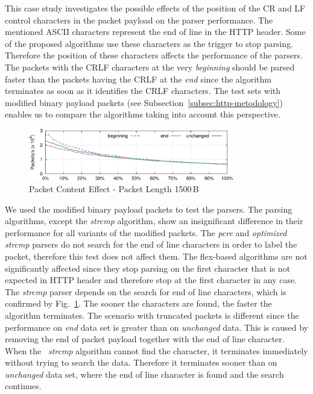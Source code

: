 This case study investigates the possible effects of the position of the CR and LF control characters in the packet payload on the parser performance. The mentioned ASCII characters represent the end of line in the HTTP header. Some of the proposed algorithms use these characters as the trigger to stop parsing. Therefore the position of these characters affects the performance of the parsers. The packets with the CRLF characters at the very \emph{beginning} should be parsed faster than the packets having the CRLF at the \emph{end} since the algorithm terminates as soon as it identifies the CRLF characters. The test sets with modified binary payload packets (see Subsection~\ref{subsec:http-metodology}) enables us to compare the algorithms taking into account this perspective.

\begin{figure}[t]
    \centering
    \includegraphics[width=0.8\textwidth]{figures/paper-http/1500_noflex}
    \caption{Packet Content Effect - Packet Length 1500\,B}
    \label{fig:http-packet_structure}
\end{figure}

We used the modified binary payload packets to test the parsers. The parsing algorithms, except the \emph{strcmp} algorithm, show an insignificant difference in their performance for all variants of the modified packets. The \emph{pcre} and \emph{optimized strcmp} parsers do not search for the end of line characters in order to label the packet, therefore this test does not affect them. The flex-based algorithms are not significantly affected since they stop parsing on the first character that is not expected in HTTP header and therefore stop at the first character in any case. The \emph{strcmp} parser depends on the search for end of line characters, which is confirmed by Fig.~\ref{fig:http-packet_structure}. The sooner the characters are found, the faster the algorithm terminates. The scenario with truncated packets is different since the performance on \emph{end} data set is greater than on \emph{unchanged} data. This is caused by removing the end of packet payload together with the end of line character. When the \
\emph{strcmp} algorithm cannot find the character, it terminates immediately without trying to search the data. Therefore it terminates sooner than on \emph{unchanged} data set, where the end of line character is found and the search continues.

